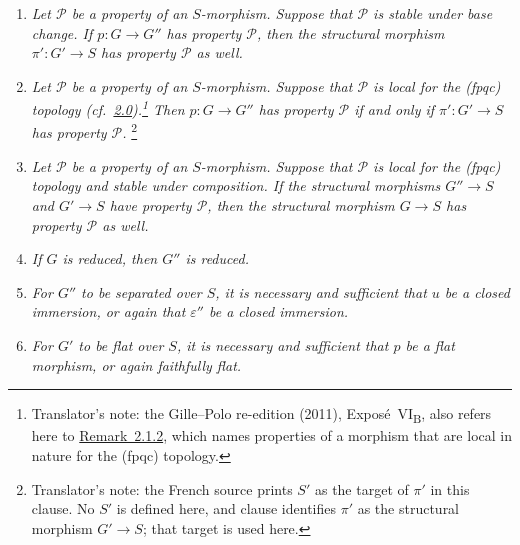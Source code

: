 \begin{enumerate}
\item[\textup{(vi)}]\label{concl:sga3-VIB-9.2-vi}
  \emph{Let \(\mathscr P\) be a property of an \(S\)-morphism.
  Suppose that \(\mathscr P\) is stable under base change. If
  \(p:G\to G''\) has property \(\mathscr P\), then the structural
  morphism \(\pi':G'\to S\) has property \(\mathscr P\) as well.}

\item[\textup{(vii)}]\label{concl:sga3-VIB-9.2-vii}
  \emph{Let \(\mathscr P\) be a property of an \(S\)-morphism.
  Suppose that \(\mathscr P\) is local for the \textup{(fpqc)}
  topology \textup{(cf.\
  \hyperref[par:sga3-VIB-2.0]{2.0})}.\footnote{Translator's note: the Gille--Polo re-edition (2011),
  Expos\'e~VI\textsubscript{B}, also refers here to \hyperref[rem:sga3-VIB-2.1.2]{Remark~2.1.2}, which names
  properties of a morphism that are local in nature for the \textup{(fpqc)} topology.} Then \(p:G\to G''\)
  has property \(\mathscr P\) if and only if
  \(\pi':G'\to S\) has property \(\mathscr P\).}%
  \begingroup
  \renewcommand{\thefootnote}{\fnsymbol{footnote}}%
  \footnote[1]{\label{note:sga3-VIB-9.2-vii-base}
  Translator's note: the French source prints \(S'\) as the target of
  \(\pi'\) in this clause. No \(S'\) is defined here, and clause
  \textup{\SGARefLink{concl:sga3-VIB-9.2-vi}{(vi)}} identifies \(\pi'\) as the structural morphism
  \(G'\to S\); that target is used here.}%
  \endgroup

\item[\textup{(viii)}]\label{concl:sga3-VIB-9.2-viii}
  \emph{Let \(\mathscr P\) be a property of an \(S\)-morphism.
  Suppose that \(\mathscr P\) is local for the \textup{(fpqc)}
  topology and stable under composition. If the structural
  morphisms \(G''\to S\) and \(G'\to S\) have property
  \(\mathscr P\), then the structural morphism \(G\to S\) has
  property \(\mathscr P\) as well.}

\item[\textup{(ix)}]\label{concl:sga3-VIB-9.2-ix}
  \emph{If \(G\) is reduced, then \(G''\) is reduced.}

\item[\textup{(x)}]\label{concl:sga3-VIB-9.2-x}
  \emph{For \(G''\) to be separated over \(S\), it is necessary
  and sufficient that \(u\) be a closed immersion, or again that
  \(\varepsilon''\) be a closed immersion.}

\item[\textup{(xi)}]\label{concl:sga3-VIB-9.2-xi}
  \emph{For \(G'\) to be flat over \(S\), it is necessary and
  sufficient that \(p\) be a flat morphism, or again faithfully
  flat.}


\end{enumerate}
